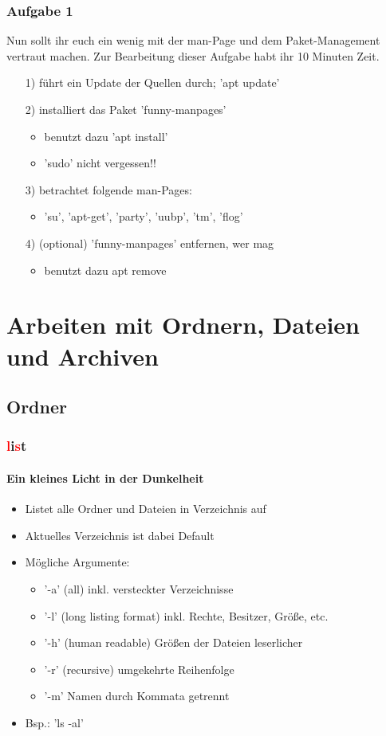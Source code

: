\documentclass[12pt,utf8, handout]{beamer}
\begin{document}
\begin{frame}
\frametitle{Aufgabe 1}
Nun sollt ihr euch ein wenig mit der man-Page und dem Paket-Management vertraut machen. Zur Bearbeitung dieser Aufgabe habt ihr 10 Minuten Zeit.
\begin{itemize}
	\item[1)] führt ein Update der Quellen durch; 'apt update'
	\item[2)] installiert das Paket 'funny-manpages'
	\begin{itemize}
		\item benutzt dazu 'apt install'
		\item 'sudo' nicht vergessen!!
	\end{itemize}
	\item[3)] betrachtet folgende man-Pages:
	\begin{itemize}
		\item 'su', 'apt-get', 'party', 'uubp', 'tm', 'flog'
	\end{itemize}
	\item[4)] (optional) 'funny-manpages' entfernen, wer mag
	\begin{itemize}
		\item benutzt dazu apt remove
	\end{itemize}
\end{itemize} 
\end{frame}

\section{Arbeiten mit Ordnern, Dateien und Archiven}
\subsection{Ordner}
\begin{frame}
\frametitle{\textcolor{red}{l}i\textcolor{red}{s}t}
\framesubtitle{\textcolor{ownDarkOr}{Ein kleines Licht in der Dunkelheit}}
\begin{itemize}
	\item Listet alle Ordner und Dateien in Verzeichnis auf
	\item Aktuelles Verzeichnis ist dabei Default
	\item Mögliche Argumente:
	\begin{itemize}[<+->]
		\item '-a'  (all) inkl. versteckter Verzeichnisse
		\item '-l'  (long listing format) inkl. Rechte, Besitzer, Größe, etc.
		\item '-h'  (human readable) Größen der Dateien leserlicher
		\item '-r'  (recursive) umgekehrte Reihenfolge
		\item '-m'  Namen durch Kommata getrennt
	\end{itemize}
	\item Bsp.: 'ls -al'
\end{itemize}
\end{frame}
\end{document}
